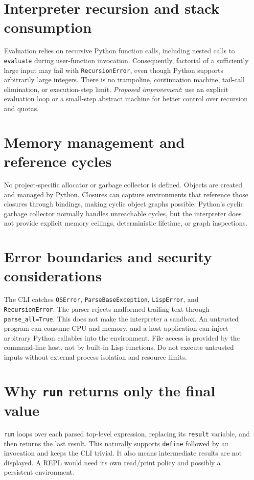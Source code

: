 \documentclass[11pt,a4paper,oneside]{report}
\begin{document}
\section{Interpreter recursion and stack consumption}
Evaluation relies on recursive Python function calls, including nested calls to \texttt{evaluate} during user-function invocation. Consequently, factorial of a sufficiently large input may fail with \texttt{RecursionError}, even though Python supports arbitrarily large integers. There is no trampoline, continuation machine, tail-call elimination, or execution-step limit. \emph{Proposed improvement}: use an explicit evaluation loop or a small-step abstract machine for better control over recursion and quotas.
\section{Memory management and reference cycles}
No project-specific allocator or garbage collector is defined. Objects are created and managed by Python. Closures can capture environments that reference those closures through bindings, making cyclic object graphs possible. Python's cyclic garbage collector normally handles unreachable cycles, but the interpreter does not provide explicit memory ceilings, deterministic lifetime, or graph inspections.
\section{Error boundaries and security considerations}
The CLI catches \texttt{OSError}, \texttt{ParseBaseException}, \texttt{LispError}, and \texttt{RecursionError}. The parser rejects malformed trailing text through \texttt{parse\_all=True}. This does not make the interpreter a sandbox. An untrusted program can consume CPU and memory, and a host application can inject arbitrary Python callables into the environment. File access is provided by the command-line host, not by built-in Lisp functions. Do not execute untrusted inputs without external process isolation and resource limits.
\section{Why \texttt{run} returns only the final value}
\texttt{run} loops over each parsed top-level expression, replacing its \texttt{result} variable, and then returns the last result. This naturally supports \texttt{define} followed by an invocation and keeps the CLI trivial. It also means intermediate results are not displayed. A REPL would need its own read/print policy and possibly a persistent environment.
\end{document}
